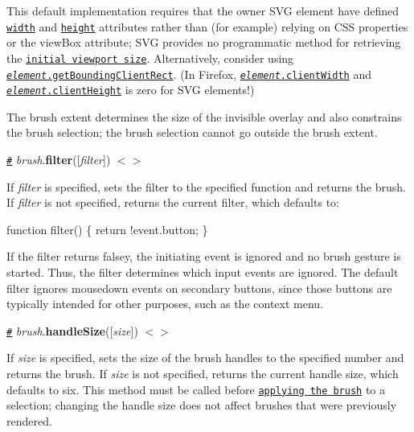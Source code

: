 This default implementation requires that the owner S\+VG element have defined \href{https://www.w3.org/TR/SVG/struct.html#SVGElementWidthAttribute}{\tt width} and \href{https://www.w3.org/TR/SVG/struct.html#SVGElementHeightAttribute}{\tt height} attributes rather than (for example) relying on C\+SS properties or the view\+Box attribute; S\+VG provides no programmatic method for retrieving the \href{https://www.w3.org/TR/SVG/coords.html#ViewportSpace}{\tt initial viewport size}. Alternatively, consider using \href{https://developer.mozilla.org/en-US/docs/Web/API/Element/getBoundingClientRect}{\tt {\itshape element}.get\+Bounding\+Client\+Rect}. (In Firefox, \href{https://developer.mozilla.org/en-US/docs/Web/API/Element/clientWidth}{\tt {\itshape element}.client\+Width} and \href{https://developer.mozilla.org/en-US/docs/Web/API/Element/clientHeight}{\tt {\itshape element}.client\+Height} is zero for S\+VG elements!)

The brush extent determines the size of the invisible overlay and also constrains the brush selection; the brush selection cannot go outside the brush extent.

\href{#brush_filter}{\tt \#} {\itshape brush}.{\bfseries filter}(\mbox{[}{\itshape filter}\mbox{]}) \href{https://github.com/d3/d3-brush/blob/master/src/brush.js#L525}{\tt $<$$>$}

If {\itshape filter} is specified, sets the filter to the specified function and returns the brush. If {\itshape filter} is not specified, returns the current filter, which defaults to\+:


\begin{DoxyCode}
function filter() \{
  return !event.button;
\}
\end{DoxyCode}


If the filter returns falsey, the initiating event is ignored and no brush gesture is started. Thus, the filter determines which input events are ignored. The default filter ignores mousedown events on secondary buttons, since those buttons are typically intended for other purposes, such as the context menu.

\href{#brush_handleSize}{\tt \#} {\itshape brush}.{\bfseries handle\+Size}(\mbox{[}{\itshape size}\mbox{]}) \href{https://github.com/d3/d3-brush/blob/master/src/brush.js#L529}{\tt $<$$>$}

If {\itshape size} is specified, sets the size of the brush handles to the specified number and returns the brush. If {\itshape size} is not specified, returns the current handle size, which defaults to six. This method must be called before \href{#_brush}{\tt applying the brush} to a selection; changing the handle size does not affect brushes that were previously rendered.

